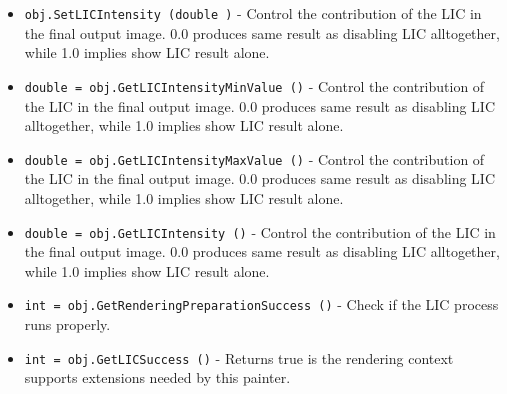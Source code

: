 \begin{itemize}
\item  \verb|obj.SetLICIntensity (double )| -  Control the contribution of the LIC in the final output image.
 0.0 produces same result as disabling LIC alltogether, while 1.0 implies
 show LIC result alone.

\item  \verb|double = obj.GetLICIntensityMinValue ()| -  Control the contribution of the LIC in the final output image.
 0.0 produces same result as disabling LIC alltogether, while 1.0 implies
 show LIC result alone.

\item  \verb|double = obj.GetLICIntensityMaxValue ()| -  Control the contribution of the LIC in the final output image.
 0.0 produces same result as disabling LIC alltogether, while 1.0 implies
 show LIC result alone.

\item  \verb|double = obj.GetLICIntensity ()| -  Control the contribution of the LIC in the final output image.
 0.0 produces same result as disabling LIC alltogether, while 1.0 implies
 show LIC result alone.

\item  \verb|int = obj.GetRenderingPreparationSuccess ()| -  Check if the LIC process runs properly.

\item  \verb|int = obj.GetLICSuccess ()| -  Returns true is the rendering context supports extensions needed by this
 painter.

\end{itemize}
